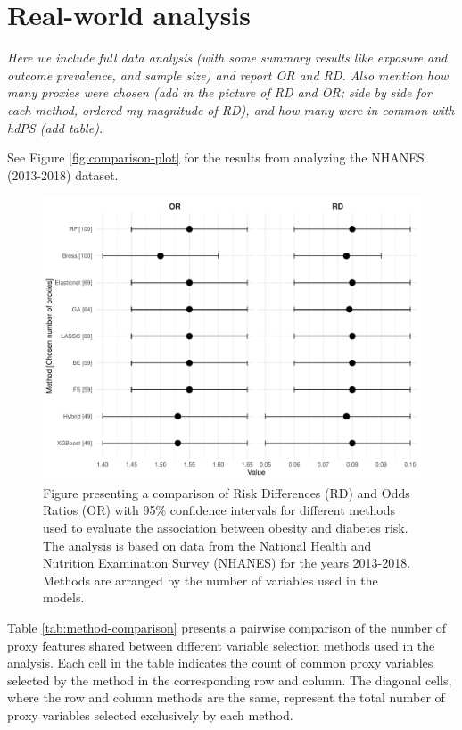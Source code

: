 \documentclass[sn-vancouver,Numbered,lineno,pdflatex]{sn-jnl}
\begin{document}
\section{Real-world analysis}\label{real-world-analysis}

\emph{Here we include full data analysis (with some summary results like
exposure and outcome prevalence, and sample size) and report OR and RD.
Also mention how many proxies were chosen (add in the picture of RD and
OR; side by side for each method, ordered my magnitude of RD), and how
many were in common with hdPS (add table).}

See Figure \ref{fig:comparison-plot} for the results from analyzing the
NHANES (2013-2018) dataset.

\begin{figure}[th]

{\centering \includegraphics[width=1\linewidth,]{manuscript_files/figure-latex/unnamed-chunk-3-1} 

}

\caption{Figure presenting a comparison of Risk Differences (RD) and Odds Ratios (OR) with 95\% confidence intervals for different methods used to evaluate the association between obesity and diabetes risk. The analysis is based on data from the National Health and Nutrition Examination Survey (NHANES) for the years 2013-2018. Methods are arranged by the number of variables used in the models.\label{fig:comparison-plot}}\label{fig:unnamed-chunk-3}
\end{figure}

Table \ref{tab:method-comparison} presents a pairwise comparison of the
number of proxy features shared between different variable selection
methods used in the analysis. Each cell in the table indicates the count
of common proxy variables selected by the method in the corresponding
row and column. The diagonal cells, where the row and column methods are
the same, represent the total number of proxy variables selected
exclusively by each method.
\end{document}
